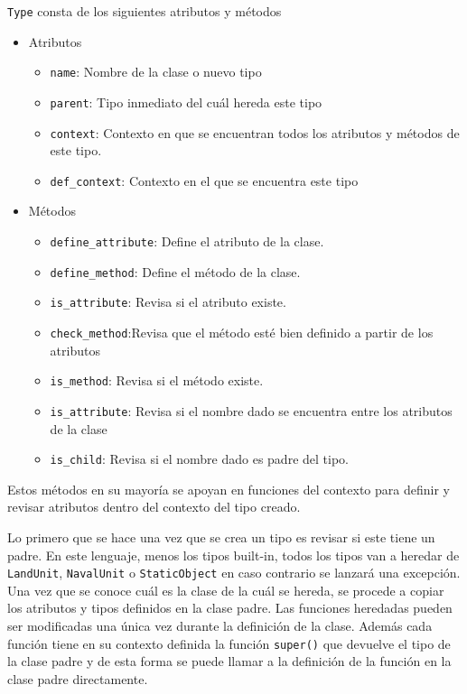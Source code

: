   \verb|Type| consta de los siguientes atributos y m\'etodos 
  \begin{itemize}
  \item Atributos
  \begin{itemize}
  \item \verb|name|: Nombre de la clase o nuevo tipo
  
  \item \verb|parent|: Tipo inmediato del cuál hereda este tipo
  
  \item \verb|context|: Contexto en que se encuentran todos los atributos y métodos de este tipo. 
  
  \item \verb|def_context|: Contexto en el que se encuentra este tipo
  \end{itemize}
  
  \item M\'etodos
  \begin{itemize}  
  \item \verb|define_attribute|: Define el atributo de la clase.
  
  \item \verb|define_method|: Define el m\'etodo de la clase.
  
  \item \verb|is_attribute|: Revisa si el atributo existe.
  
  \item \verb|check_method|:Revisa que el método esté bien definido a partir de los atributos
  
  \item \verb|is_method|: Revisa si el m\'etodo existe.
  
  \item \verb|is_attribute|: Revisa si el nombre dado se encuentra entre los atributos de la clase
  
  \item \verb|is_child|: Revisa si el nombre dado es padre del tipo.
  \end{itemize}
  \end{itemize}
  Estos métodos en su mayoría se apoyan en funciones del contexto para definir y revisar atributos dentro del contexto del tipo creado.
  
  Lo primero que se hace una vez que se crea un tipo es revisar si este tiene un padre. En este lenguaje, menos los tipos built-in, todos los tipos van a heredar de \verb|LandUnit|, \verb|NavalUnit| o \verb|StaticObject| en caso contrario se lanzará una excepción. Una vez que se conoce cuál es la clase de la cuál se hereda, se procede a copiar los atributos y tipos definidos en la clase padre. Las funciones heredadas pueden ser modificadas una única vez durante la definición de la clase. Además cada función tiene en su contexto definida la función \verb|super()| que devuelve el tipo de la clase padre y de esta forma se puede llamar a la definición de la función en la clase padre directamente.

